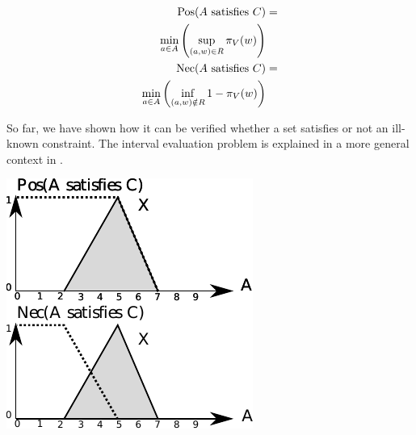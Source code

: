 \vspace{-10pt}

\begin{align}
\label{ill-known-pos}\
\operatorname{Pos}(A\text{ satisfies }C) & =\\
\nonumber
\min_{a \in A}\left(\sup_{(a,w) \in R}\pi_{V}(w)\right) \\
\label{ill-known-nec}
\operatorname{Nec}(A\text{ satisfies }C) & =\\
\nonumber
\min_{a \in A}\left(\inf_{(a,w) \notin R} 1-\pi_{V}(w)\right) 
\end{align}

So far, we have shown how it can be verified whether a set satisfies or not an ill-known constraint. The interval evaluation problem is explained in a more general context in \cite{Pons2011}.

\begin{samepage}
\vspace*{13pt}
\begin{center}
{
\includegraphics[scale=1]{./graphs/example-ill-known.pdf}
}
\end{center}
\vspace*{10pt}
\vspace*{13pt}
\end{samepage}



